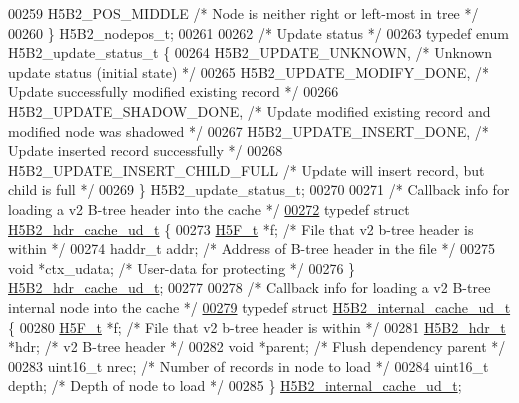 \begin{DoxyCode}
{{00259     H5B2\_POS\_MIDDLE             \textcolor{comment}{/* Node is neither right or left-most in tree */}
00260 \} H5B2\_nodepos\_t;
00261 
00262 \textcolor{comment}{/* Update status */}
00263 \textcolor{keyword}{typedef} \textcolor{keyword}{enum} H5B2\_update\_status\_t \{
00264     H5B2\_UPDATE\_UNKNOWN,            \textcolor{comment}{/* Unknown update status (initial state) */}
00265     H5B2\_UPDATE\_MODIFY\_DONE,        \textcolor{comment}{/* Update successfully modified existing record */}
00266     H5B2\_UPDATE\_SHADOW\_DONE,        \textcolor{comment}{/* Update modified existing record and modified node was shadowed */}
00267     H5B2\_UPDATE\_INSERT\_DONE,        \textcolor{comment}{/* Update inserted record successfully */}
00268     H5B2\_UPDATE\_INSERT\_CHILD\_FULL   \textcolor{comment}{/* Update will insert record, but child is full */}
00269 \} H5B2\_update\_status\_t;
00270 
00271 \textcolor{comment}{/* Callback info for loading a v2 B-tree header into the cache */}
\hyperlink{struct_h5_b2__hdr__cache__ud__t}{00272} \textcolor{keyword}{typedef} \textcolor{keyword}{struct }\hyperlink{struct_h5_b2__hdr__cache__ud__t}{H5B2\_hdr\_cache\_ud\_t} \{
00273     \hyperlink{struct_h5_f__t}{H5F\_t} *f;                   \textcolor{comment}{/* File that v2 b-tree header is within */}
00274     haddr\_t addr;               \textcolor{comment}{/* Address of B-tree header in the file */}
00275     \textcolor{keywordtype}{void} *ctx\_udata;            \textcolor{comment}{/* User-data for protecting */}
00276 \} \hyperlink{struct_h5_b2__hdr__cache__ud__t}{H5B2\_hdr\_cache\_ud\_t};
00277 
00278 \textcolor{comment}{/* Callback info for loading a v2 B-tree internal node into the cache */}
\hyperlink{struct_h5_b2__internal__cache__ud__t}{00279} \textcolor{keyword}{typedef} \textcolor{keyword}{struct }\hyperlink{struct_h5_b2__internal__cache__ud__t}{H5B2\_internal\_cache\_ud\_t} \{
00280     \hyperlink{struct_h5_f__t}{H5F\_t} *f;                   \textcolor{comment}{/* File that v2 b-tree header is within */}
00281     \hyperlink{struct_h5_b2__hdr__t}{H5B2\_hdr\_t} *hdr;            \textcolor{comment}{/* v2 B-tree header */}
00282     \textcolor{keywordtype}{void} *parent;               \textcolor{comment}{/* Flush dependency parent */}
00283     uint16\_t nrec;              \textcolor{comment}{/* Number of records in node to load */}
00284     uint16\_t depth;             \textcolor{comment}{/* Depth of node to load */}
00285 \} \hyperlink{struct_h5_b2__internal__cache__ud__t}{H5B2\_internal\_cache\_ud\_t};
}}
\end{DoxyCode}
